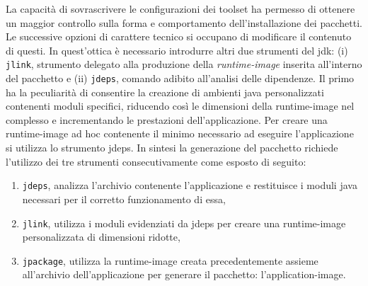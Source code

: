 La capacità di sovrascrivere le configurazioni dei toolset ha permesso di ottenere un maggior controllo sulla forma e comportamento dell'installazione dei pacchetti. Le successive opzioni di carattere tecnico si occupano di modificare il contenuto di questi. In quest'ottica è necessario introdurre altri due strumenti del \ac{jdk}: (i) \texttt{jlink}, strumento delegato alla produzione della \textit{runtime-image} inserita all'interno del pacchetto e (ii) \texttt{jdeps}, comando adibito all'analisi delle dipendenze. Il primo ha la peculiarità di consentire la creazione di ambienti java personalizzati contenenti moduli specifici, riducendo così le dimensioni della runtime-image nel complesso e incrementando le prestazioni dell'applicazione. Per creare una runtime-image ad hoc contenente il minimo necessario ad eseguire l'applicazione si utilizza lo strumento jdeps. In sintesi la generazione del pacchetto richiede l'utilizzo dei tre strumenti consecutivamente come esposto di seguito:
\begin{enumerate}
	\item \texttt{jdeps}, analizza l'archivio contenente l'applicazione e restituisce i moduli java necessari per il corretto funzionamento di essa,
	\item \texttt{jlink}, utilizza i moduli evidenziati da jdeps per creare una runtime-image personalizzata di dimensioni ridotte,
	\item \texttt{jpackage}, utilizza la runtime-image creata precedentemente assieme all'ar\-chi\-vio dell'applicazione per generare il pacchetto: l'application-image.
\end{enumerate}



